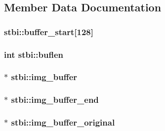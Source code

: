 \subsection{Member Data Documentation}
\hypertarget{structstbi_af99edda496281a6ca1b58271cabdbc69}{}
\subsubsection[{buffer\+\_\+start}]{ stbi\+::buffer\+\_\+start\mbox{[}128\mbox{]}}\label{structstbi_af99edda496281a6ca1b58271cabdbc69}
\hypertarget{structstbi_a76d6f761529ecff7f02469b19371af0e}{}
\subsubsection[{buflen}]{\setlength{\rightskip}{0pt plus 5cm}int stbi\+::buflen}\label{structstbi_a76d6f761529ecff7f02469b19371af0e}
\hypertarget{structstbi_aace36d5487a596bea5faa0aef0398ac8}{}
\subsubsection[{img\+\_\+buffer}]{$\ast$ stbi\+::img\+\_\+buffer}\label{structstbi_aace36d5487a596bea5faa0aef0398ac8}
\hypertarget{structstbi_a55f78565e605f1784d47fc9acea475f3}{}
\subsubsection[{img\+\_\+buffer\+\_\+end}]{ $\ast$ stbi\+::img\+\_\+buffer\+\_\+end}\label{structstbi_a55f78565e605f1784d47fc9acea475f3}
\hypertarget{structstbi_a261be6edda817862e623972b21b4f965}{}
\subsubsection[{img\+\_\+buffer\+\_\+original}]{$\ast$ stbi\+::img\+\_\+buffer\+\_\+original}\label{structstbi_a261be6edda817862e623972b21b4f965}
\hypertarget{structstbi_ae22cfcc23f5ab67bede22942333ecbd7}{}
